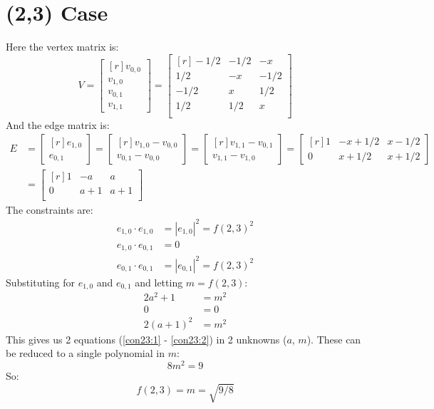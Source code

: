 \documentclass[12pt,titlepage]{article}
\numberwithin{equation}{section}
\begin{document}
\section{(2,3) Case}

Here the vertex matrix is:
\begin{equation*}
V =
\begin{bmatrix*}[r]
v_{0,0} \\
v_{1,0} \\
v_{0,1} \\
v_{1,1}
\end{bmatrix*}
=
\begin{bmatrix*}[r]
-1/2 & -1/2 &   -x \\
 1/2 &   -x & -1/2 \\
-1/2 &    x &  1/2 \\
 1/2 &  1/2 &    x \\
\end{bmatrix*}
\end{equation*}
And the edge matrix is:
\begin{align*}
E &=
\begin{bmatrix*}[r]
e_{1,0} \\
e_{0,1}
\end{bmatrix*}
=
\begin{bmatrix*}[r]
v_{1,0} - v_{0,0} \\
v_{0,1} - v_{0,0}
\end{bmatrix*}
=
\begin{bmatrix*}[r]
v_{1,1} - v_{0,1} \\
v_{1,1} - v_{1,0}
\end{bmatrix*}
=
\begin{bmatrix*}[r]
1 & -x + 1/2 & x - 1/2 \\
0 &  x + 1/2 & x + 1/2
\end{bmatrix*}
\\
&=
\begin{bmatrix*}[r]
1 & -a   & a   \\
0 &  a+1 & a+1 \\
\end{bmatrix*}
\end{align*}
The constraints are:
\begin{align*}
e_{1,0} \cdot e_{1,0} &= |e_{1,0}|^2 = f(2,3)^2 \\
e_{1,0} \cdot e_{0,1} &= 0                      \\
e_{0,1} \cdot e_{0,1} &= |e_{0,1}|^2 = f(2,3)^2
\end{align*}
Substituting for $e_{1,0}$ and $e_{0,1}$ and letting $m = f(2,3)$:
\begin{align}
2a^2 + 1 &= m^2 \label{con23:1} \\
       0 &= 0   \nonumber       \\
2(a+1)^2 &= m^2 \label{con23:2}
\end{align}
This gives us 2 equations (\ref{con23:1} - \ref{con23:2}) in 2 unknowns
($a$, $m$).  These can be reduced to a single polynomial in $m$:
\begin{equation*}
8 m^2 = 9
\end{equation*}
So:
\begin{equation*}
f(2,3) = m = \sqrt{9/8}
\end{equation*}
\end{document}
